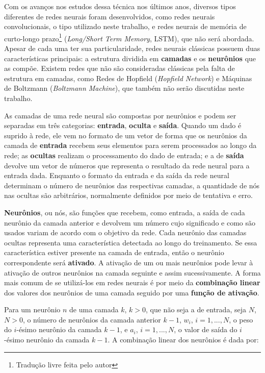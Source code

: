 Com os avanços nos estudos dessa técnica nos últimos anos, diversos tipos diferentes de redes neurais foram desenvolvidos, como redes neurais convolucionais, o tipo utilizado neste trabalho, e redes neurais de memória de curto-longo prazo\footnote{Tradução livre feita pelo autor} (\textit{Long/Short Term Memory}, LSTM), que não será abordada.
Apesar de cada uma ter sua particularidade, redes neurais clássicas possuem duas características principais: a estrutura dividida em \textbf{camadas} e os \textbf{neurônios} que as compõe.
Existem redes que não são consideradas clássicas pela falta de estrutura em camadas, como Redes de Hopfield (\textit{Hopfield Network}) e Máquinas de Boltzmann (\textit{Boltzmann Machine}), que também não serão discutidas neste trabalho.

As camadas de uma rede neural são compostas por neurônios e podem ser separadas em três categorias: \textbf{entrada}, \textbf{oculta} e \textbf{saída}.
Quando um dado é suprido à rede, ele vem no formato de um vetor de forma que os neurônios da camada de \textbf{entrada} recebem seus elementos para serem processados ao longo da rede;
as \textbf{ocultas} realizam o processamento do dado de entrada;
e a de \textbf{saída} devolve um vetor de números que representa o resultado da rede neural para a entrada dada.
Enquanto o formato da entrada e da saída da rede neural determinam o número de neurônios das respectivas camadas, a quantidade de nós nas ocultas são arbitrários, normalmente definidos por meio de tentativa e erro.

\textbf{Neurônios}, ou nós, são funções que recebem, como entrada, a saída de cada neurônio da camada anterior e devolvem um número
cujo significado e como são usados variam de acordo com o objetivo da rede.
Cada neurônio das camadas ocultas representa uma característica detectada ao longo do treinamento.
Se essa característica estiver presente na camada de entrada, então o neurônio correspondente será \textbf{ativado}.
A ativação de um ou mais neurônios pode levar à ativação de outros neurônios na camada seguinte e assim sucessivamente.
A forma mais comum de se utilizá-los em redes neurais é por meio da \textbf{combinação linear} dos valores dos neurônios de uma camada seguido por uma \textbf{função de ativação}.

Para um neurônio $n$ de uma camada $k$, $k > 0$, que não seja a de entrada, seja $N$, $N > 0$, o número de neurônios da camada anterior $k-1$, $w_{i}$, $i = 1, ..., N$, o peso do $i$-ésimo neurônio da camada $k-1$, e $a_{i}$, $i = 1, ..., N$, o valor de saída do $i$-ésimo neurônio da camada $k-1$.
A combinação linear dos neurônios é dada por:

